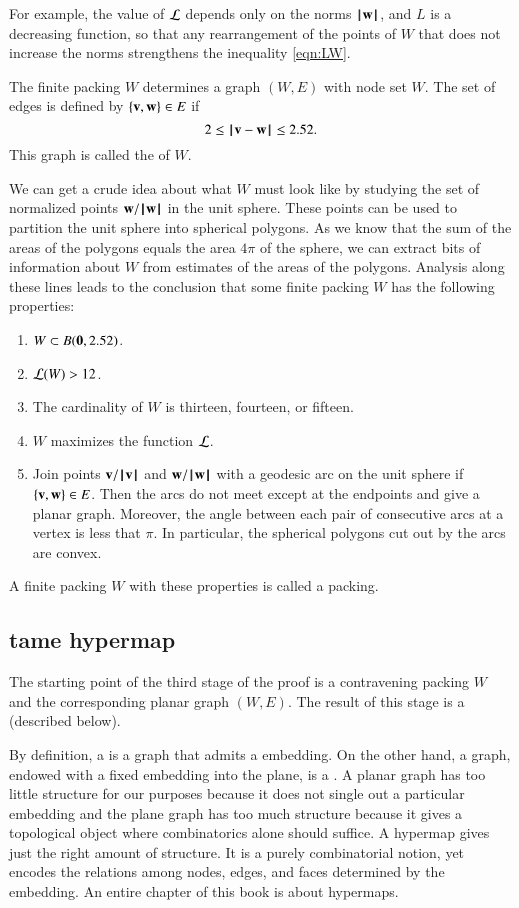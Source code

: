For example, the value of ${\mathcal L}$
depends only on the norms ${{\hskip0.1em|\hskip-0.15em|\hskip0.1em}{\mathbf w}{\hskip0.1em|\hskip-0.15em|\hskip0.1em}}$, and $L$ is a decreasing
function, so that any rearrangement of the points of $W$ that does not
increase the norms strengthens the inequality \eqref{eqn:LW}.

The finite packing $W$ determines a graph $(W,E)$ with node set $W$.  The set
of edges is defined by $\{{\mathbf v},{\mathbf w}\}\in E$ if 
\[2\le\norm{\v}{\w}\le 2.52.\] This graph is called the  of $W$.

We can get a crude idea about what $W$ must look like by studying the
set of normalized points ${\mathbf w}/{{\hskip0.1em|\hskip-0.15em|\hskip0.1em}{\mathbf w}{\hskip0.1em|\hskip-0.15em|\hskip0.1em}}$ in the unit sphere.  These
points can be used to partition the unit sphere into spherical
polygons.  As we know that the sum of the areas of the polygons equals
the area $4\pi$ of the sphere, we can extract bits of information
about $W$ from estimates of the areas of the polygons.  Analysis along
these lines leads to the conclusion that some finite packing $W$
has the following 
properties:
\begin{enumerate}\wasitemize 
\item $W\subset B({\mathbf 0},2.52)$.
\item ${\mathcal L}(W) > 12$.
\item The cardinality of $W$ is thirteen, fourteen, or fifteen.
\item $W$ maximizes the function ${\mathcal L}$.
\item Join points ${\mathbf v}/{{\hskip0.1em|\hskip-0.15em|\hskip0.1em}{\mathbf v}{\hskip0.1em|\hskip-0.15em|\hskip0.1em}}$ and ${\mathbf w}/{{\hskip0.1em|\hskip-0.15em|\hskip0.1em}{\mathbf w}{\hskip0.1em|\hskip-0.15em|\hskip0.1em}}$ with a geodesic arc on the
unit sphere if $\{{\mathbf v},{\mathbf w}\}\in E$.  Then the arcs do not meet except at the endpoints and
give a planar graph.  Moreover, the angle between each pair of consecutive arcs at a vertex is less
that $\pi$.  In particular, the spherical polygons cut out by the arcs are convex.
\end{enumerate}\wasitemize 
A finite packing $W$ with these properties is called a  packing.


\subsection{tame hypermap}

The starting point of the third stage of the proof is a contravening
packing $W$ and the corresponding planar graph $(W,E)$.  The result of
this stage is a  (described below).

By definition, a  is a graph that admits a
 embedding.  On the other hand, a graph, endowed with
a fixed embedding into the plane, is a .  A
planar graph has too little structure for our purposes because it
does not single out a particular embedding and the plane graph has too
much structure because it gives a topological object where combinatorics
alone should suffice.  A hypermap gives just the right amount of
structure.  It is a purely combinatorial notion, yet encodes the
relations among nodes, edges, and faces determined by the embedding.
An entire chapter of this book is about hypermaps.

